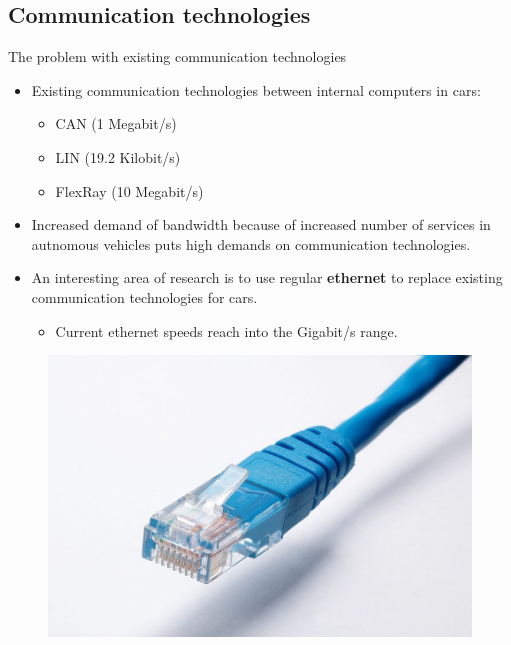 \documentclass{beamer}
\begin{document}
\subsection{Communication technologies}
\begin{frame}{The problem with existing communication technologies}
    \begin{itemize}
        \item Existing communication technologies between internal computers in cars:
            \begin{itemize}
                \item CAN (1 Megabit/s)
                \item LIN (19.2 Kilobit/s)
                \item FlexRay (10 Megabit/s)
            \end{itemize}

        \item Increased demand of bandwidth because of increased number of services in autnomous vehicles puts high demands on communication technologies.
        \item An interesting area of research is to use regular \textbf{ethernet }to replace existing communication technologies for cars.
            \begin{itemize}
                \item Current ethernet speeds reach into the Gigabit/s range.
            \end{itemize}
    \end{itemize}
    \begin{figure}
        \includegraphics[width=0.3\linewidth]{ethernet_cable.jpg}
    \end{figure}
\end{frame}

\end{document}
